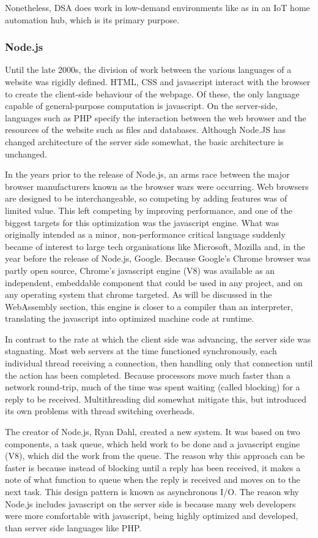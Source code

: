 \documentclass{article}
\begin{document}
Nonetheless, DSA does work in low-demand environments like as in an IoT home automation hub, which is its primary purpose.

\subsubsection{Node.js}

Until the late 2000s, the division of work between the various languages of a website was rigidly defined. HTML, CSS and javascript interact with the browser to create the client-side behaviour of the webpage. Of these, the only language capable of general-purpose computation is javascript. On the server-side, languages such as PHP specify the interaction between the web browser and the resources of the website such as files and databases. Although Node.JS has changed architecture of the server side somewhat, the basic architecture is unchanged.

In the years prior to the release of Node.js, an arms race between the major browser manufacturers known as the browser wars \cite{war} were occurring. Web browsers are designed to be interchangeable, so competing by adding features was of limited value. This left competing by improving performance, and one of the biggest targets for this optimization was the javascript engine. What was originally intended as a minor, non-performance critical language suddenly became of interest to large tech organisations like Microsoft, Mozilla and, in the year before the release of Node.js, Google. Because Google's Chrome browser was partly open source, Chrome's javascript engine (V8) was available as an independent, embeddable component that could be used in any project, and on any operating system that chrome targeted. As will be discussed in the WebAssembly section, this engine is closer to a compiler than an interpreter, translating the javascript into optimized machine code at runtime.

In contrast to the rate at which the client side was advancing, the server side was stagnating. Most web servers at the time functioned synchronously, each individual thread receiving a connection, then handling only that connection until the action has been completed. Because processors move much faster than a network round-trip, much of the time was spent waiting (called blocking) for a reply to be received. Multithreading did somewhat mitigate this, but introduced its own problems with thread switching overheads.

The creator of Node.js, Ryan Dahl, created a new system. It was based on two components, a task queue, which held work to be done and a javascript engine (V8), which did the work from the queue. The reason why this approach can be faster is because instead of blocking until a reply has been received, it makes a note of what function to queue when the reply is received and moves on to the next task. This design pattern is known as asynchronous I/O\cite{async}. The reason why Node.js includes javascript on the server side is because many web developers were more comfortable with javascript, being highly optimized and developed, than server side languages like PHP. 
\end{document}
